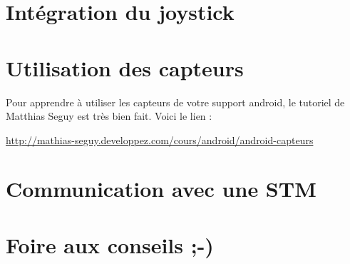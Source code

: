 \documentclass[a4paper,10pt]{article}
\begin{document}

\section{Intégration du joystick}


\section{Utilisation des capteurs}
Pour apprendre à utiliser les capteurs de votre support android, le tutoriel de Matthias Seguy est très bien fait. 
Voici le lien : 

\url{http://mathias-seguy.developpez.com/cours/android/android-capteurs}

\section{Communication avec une STM}


\section{Foire aux conseils ;-)}
\end{document}
